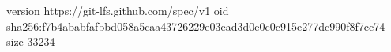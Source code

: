 version https://git-lfs.github.com/spec/v1
oid sha256:f7b4ababfafbbd058a5caa43726229e03ead3d0e0c0c915e277dc990f8f7cc74
size 33234
